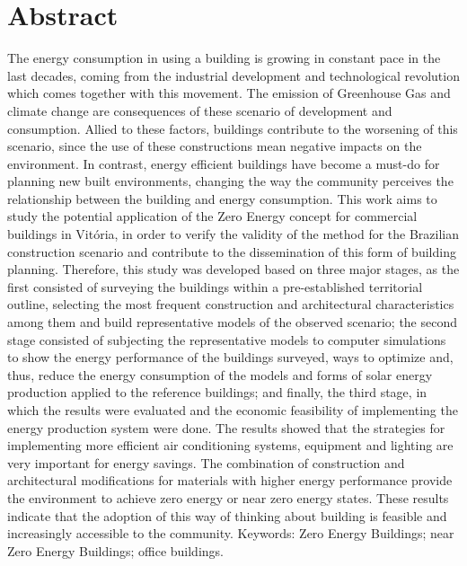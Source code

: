 \section*{Abstract}
\vspace*{1.5cm} %
\thispagestyle{empty}
    \begin{onehalfspace}
The energy consumption in using a building is growing in constant pace in the last decades, coming from the industrial development and technological revolution which comes together with this movement. The emission of Greenhouse Gas and climate change are consequences of these scenario of development and consumption. Allied to these factors, buildings contribute to the worsening of this scenario, since the use of these constructions mean negative impacts on the environment. In contrast, energy efficient buildings have become a must-do for planning new built environments, changing the way the community perceives the relationship between the building and energy consumption. This work aims to study the potential application of the Zero Energy concept for commercial buildings in Vitória, in order to verify the validity of the method for the Brazilian construction scenario and contribute to the dissemination of this form of building planning. Therefore, this study was developed based on three major stages, as the first consisted of surveying the buildings within a pre-established territorial outline, selecting the most frequent construction and architectural characteristics among them and build representative models of the observed scenario; the second stage consisted of subjecting the representative models to computer simulations to show the energy performance of the buildings surveyed, ways to optimize and, thus, reduce the energy consumption of the models and forms of solar energy production applied to the reference buildings; and finally, the third stage, in which the results were evaluated and the economic feasibility of implementing the energy production system were done. The results showed that the strategies for implementing more efficient air conditioning systems, equipment and lighting are very important for energy savings. The combination of construction and architectural modifications for materials with higher energy performance provide the environment to achieve zero energy or near zero energy states. These results indicate that the adoption of this way of thinking about building is feasible and increasingly accessible to the community.\newline
        \noindent Keywords: Zero Energy Buildings; near Zero Energy Buildings; office buildings.
        \pagebreak
    \end{onehalfspace}
